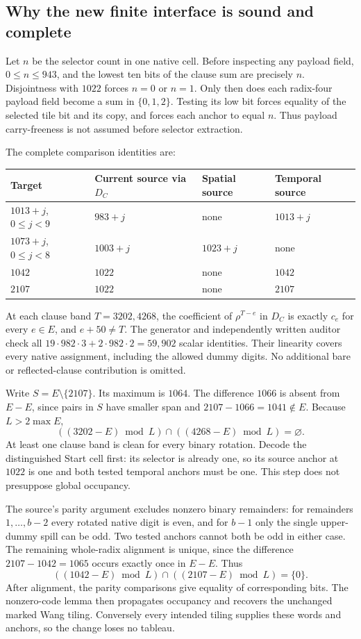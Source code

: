 \subsection{Why the new finite interface is sound and complete}

Let $n$ be the selector count in one native cell.  Before inspecting any
payload field, $0\le n\le943$, and the lowest ten bits of the clause sum
are precisely $n$.  Disjointness with $1022$ forces $n=0$ or $n=1$.
Only then does each radix-four payload field become a sum in
$\{0,1,2\}$.  Testing its low bit forces equality of the selected tile
bit and its copy, and forces each anchor to equal $n$.  Thus payload
carry-freeness is not assumed before selector extraction.

The complete comparison identities are:
\begin{center}\small
\begin{tabular}{llll}
\hline
Target & Current source via $D_C$ & Spatial source & Temporal source\\
\hline
$1013+j$, $0\le j<9$ & $983+j$ & none & $1013+j$\\
$1073+j$, $0\le j<8$ & $1003+j$ & $1023+j$ & none\\
$1042$ & $1022$ & none & $1042$\\
$2107$ & $1022$ & none & $2107$\\
\hline
\end{tabular}
\end{center}
At each clause band $T=3202,4268$, the coefficient of $\rho^{T-e}$ in
$D_C$ is exactly $c_e$ for every $e\in E$, and $e+50\ne T$.  The
generator and independently written auditor check all
$19\cdot982\cdot3+2\cdot982\cdot2=59{,}902$ scalar identities.  Their
linearity covers every native assignment, including the allowed dummy
digits.  No additional bare or reflected-clause contribution is omitted.

Write $S=E\setminus\{2107\}$.  Its maximum is $1064$.
The difference $1066$ is absent from $E-E$, since pairs in $S$ have
smaller span and $2107-1066=1041\notin E$.  Because $L>2\max E$,
\[
 ((3202-E)\bmod L)\cap((4268-E)\bmod L)=\varnothing.
\]
At least one clause band is clean for every binary rotation.  Decode
the distinguished Start cell first: its selector is already one, so its
source anchor at $1022$ is one and both tested temporal anchors must be
one.  This step does not presuppose global occupancy.

The source's parity argument excludes nonzero binary remainders: for
remainders $1,\ldots,b-2$ every rotated native digit is even, and for
$b-1$ only the single upper-dummy spill can be odd.  Two tested anchors
cannot both be odd in either case.  The remaining whole-radix alignment
is unique, since the difference $2107-1042=1065$ occurs exactly once in
$E-E$.  Thus
\[
 ((1042-E)\bmod L)\cap((2107-E)\bmod L)=\{0\}.
\]
After alignment, the parity comparisons give equality of corresponding
bits.  The nonzero-code lemma then propagates occupancy and recovers
the unchanged marked Wang tiling.  Conversely every intended tiling
supplies these words and anchors, so the change loses no tableau.

